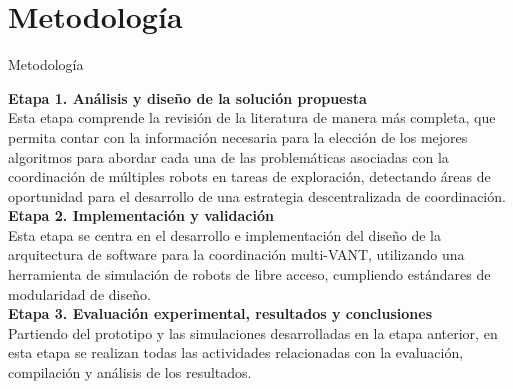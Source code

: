 \documentclass[
  24pt, %
  aspectratio=169, %
]{beamer}
\begin{document}
\section{Metodología}
\begin{frame}{Metodología}

\small \textbf{Etapa 1. An\'{a}lisis y dise\~{n}o de la soluci\'{o}n propuesta}\\
\small Esta etapa comprende la revisi\'{o}n de la literatura de manera m\'{a}s completa, que permita contar con la informaci\'{o}n necesaria para la elecci\'{o}n de los mejores algoritmos para abordar cada una de las problem\'{a}ticas asociadas con la coordinaci\'{o}n de múltiples robots en tareas de exploración, detectando áreas de oportunidad para el desarrollo de una estrategia descentralizada de coordinación. \\
\bigskip
\small \textbf{Etapa 2. Implementaci\'{o}n y validaci\'{o}n}\\
\small Esta etapa se centra en el desarrollo e implementaci\'{o}n del dise\~{n}o de la arquitectura de software para la coordinaci\'{o}n multi-VANT, utilizando una herramienta de simulación de robots de libre acceso, cumpliendo estándares de modularidad de diseño.\\
\bigskip
\small \textbf{Etapa 3. Evaluaci\'{o}n experimental, resultados y conclusiones}\\
\small Partiendo del prototipo y las simulaciones desarrolladas en la etapa anterior, en esta etapa se realizan todas las actividades relacionadas con la evaluación, compilación y análisis de los resultados.
  
\end{frame}
\end{document}
